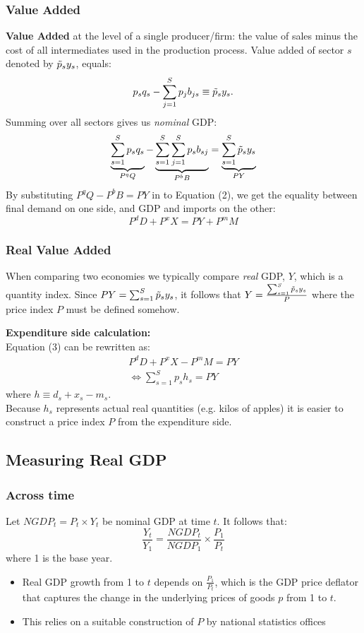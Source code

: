 \documentclass[11pt]{article}
\begin{document}
\subsubsection{Value Added}
\begin{shaded}
    \textbf{Value Added} at the level of a single producer/firm: the value of sales minus the cost of all intermediates used in the production process. Value added of sector $s$ denoted by $\Tilde{p}_sy_s$, equals:
    \[p_sq_s - \sum_{j=1}^S p_jb_{js} \equiv \Tilde{p}_sy_s.\]
    Summing over all sectors gives us \textit{nominal} GDP:
    \[\underbrace{\sum_{s=1}^S p_sq_s}_{P^q Q} -  \underbrace{\sum_{s=1}^S \sum_{j=1}^S p_s b_{sj}}_{P^b B} = \underbrace{\sum_{s=1}^S \Tilde{p}_sy_s}_{PY}\]
    By substituting $P^qQ - P^bB = PY$ in to Equation (2), we get the equality between final demand on one side, and GDP and imports on the other:
    \begin{equation}
        P^dD + P^xX = PY + P^mM
    \end{equation}
\end{shaded}

\subsubsection{Real Value Added}

When comparing two economies we typically compare \textit{real} GDP, $Y$, which is a quantity index. Since $PY = \sum_{s=1}^S \Tilde{p}_sy_s$, it follows that $Y= \frac{\sum_{s=1}^S \Tilde{p}_sy_s}{P}$ where the price index $P$ must be defined somehow.

\textbf{Expenditure side calculation:} \\

Equation (3) can be rewritten as:
\begin{gather*}
    P^dD + P^xX - P^mM = PY \\
    \Leftrightarrow \sum_{s=1}^S p_sh_s = PY
\end{gather*}
where $h\equiv d_s + x_s - m_s$. \\
Because $h_s$ represents actual real quantities (e.g. kilos of apples) it is easier to construct a price index $P$ from the expenditure side.

\subsection{Measuring Real GDP}
\subsubsection{Across time}
Let $NGDP_t = P_t \times Y_t$ be nominal GDP at time $t$. It follows that:
\[\dfrac{Y_t}{Y_1} = \dfrac{NGDP_t}{NGDP_1} \times \dfrac{P_1}{P_t}\]
where 1 is the base year.
\begin{itemize}
    \item Real GDP growth from 1 to $t$ depends on $\frac{P_1}{P_t}$, which is the GDP price deflator that captures the change in the underlying prices of goods $p$ from 1 to $t$.
    \item This relies on a suitable construction of $P$ by national statistics offices
\end{itemize}
\end{document}
